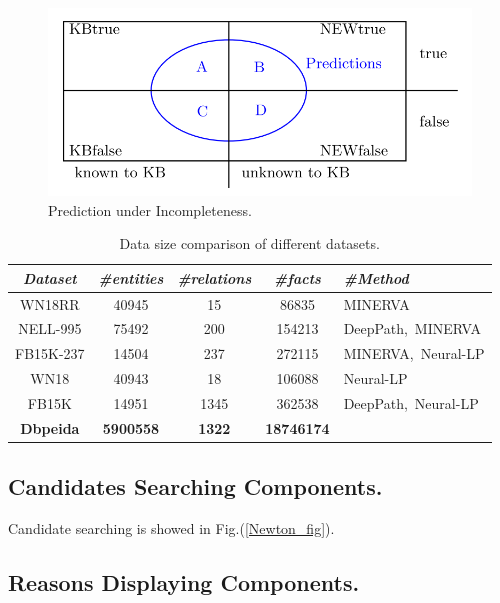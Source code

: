 \documentclass[runningheads]{llncs}
\begin{document}
\begin{figure}
\includegraphics[width=\textwidth]{pui.png}
\caption{Prediction under Incompleteness.} \label{PCA}
\end{figure}

\begin{table}
\caption{Data size comparison of different datasets.}\label{datasetCom}
\centering
\begin{tabular}{|c|c|c|c|l|}
\hline
\textit{Dataset} & \textit{\#entities} & \textit{\#relations} & \textit{\#facts} & \textit{\#Method}\\
\hline
WN18RR & 40945 & 15 & 86835 & MINERVA \\
NELL-995 & 75492 & 200 & 154213 &DeepPath,~MINERVA \\
FB15K-237 & 14504 & 237 & 272115 & MINERVA,~Neural-LP\\
WN18 & 40943 & 18 & 106088 & Neural-LP \\
FB15K & 14951 & 1345 & 362538 & DeepPath,~Neural-LP\\
\hline
\textbf{Dbpeida} & \textbf{5900558} & \textbf{1322} & \textbf{18746174} & \\
\hline
\end{tabular}
\end{table}

\subsection{Candidates Searching Components.}
Candidate searching is showed in Fig.(\ref{Newton_fig}).
\subsection{Reasons Displaying Components.}
\end{document}
